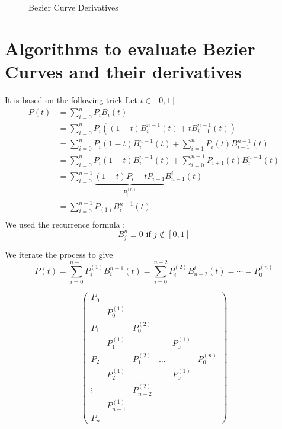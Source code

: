 \begin{figure}[ht]
    \centering
    \caption{Bezier Curve Derivatives}
    \label{fig:bezier-curve-derivatives}
\end{figure}













\section{Algorithms to evaluate Bezier Curves and their derivatives}
\label{sec:Algorithms to evaluate Bezier Curves and their derivatives}

It is based on the following trick 
Let $ t\in [0,1]  $
\begin{align*}
    P(t) &= \sum_{i=0}^{n} P_i B_i(t) \\
         &= \sum_{i=0}^{n} P_i\left( \left( 1-t\right) B _{ i }^{ n-1 } (t) + t B _{ i-1
         }^{ n-1 } (t) \right)  \\
         &= \sum_{i=0}^{n} P_i \left( 1-t\right) B _{ i }^{ n-1 } (t) + \sum_{i=1}^{n}
         P_i(t) B _{ i-1 }^{ n-1 } (t)  \\
         &= \sum_{i=0}^{n} P_i \left( 1-t\right) B _{ i }^{ n-1 } (t) + \sum_{i=0}^{n-1}
         P_{i+1} (t) B _{ i }^{ n-1 } (t)  \\ 
         &= \sum_{i=0}^{n-1} \underbrace{ \left( 1-t\right) P_i + t P _{i+1}   }_{P _{ i }^{ (n) }} 
         B _{ n-1 }^{ i } (t) \\ 
         &= \sum_{i=0}^{n-1} P _{ (1)  }^{ i  } B _{ i }^{ n-1 } (t)  \\ 
\end{align*} 
We used the recurrence formula : 
\[
    B _{ j }^{ n  } \equiv 0 \text{ if } j \notin [0,1] 
\]

We iterate the process to give 
\[
    P(t) = \sum_{i=0}^{n-1} P _{ i  }^{ (1) } B _{ i }^{ n-1 } (t) = \sum_{i=0}^{n-2} P _{
    i}^{(2) } B _{ n-2 }^{ i } (t) = \cdots = P _{ 0 }^{ (n) } 
\]

\[
\begin{pmatrix*}
    P_0&  \\
       &    P _{ 0 }^{ (1) }& \\
    P_1&                    &     P _{ 0 }^{ (2) }&\\
       &    P _{ 1 }^{ (1) }&                     &   & P _{ 0 }^{ (1) }&\\
    P_2&                    &     P _{ 1 }^{ (2) }&             \dots&  &P _{ 0 }^{ (n) } \\
       &    P _{ 2 }^{ (1) }&                     &   & P _{ 0 }^{ (1) }&\\
    \vdots&                 &   P _{ n-2 }^{ (2) }& \\
       &  P _{ n-1 }^{ (1) }&\\ 
    P_n&
\end{pmatrix*}

\]


